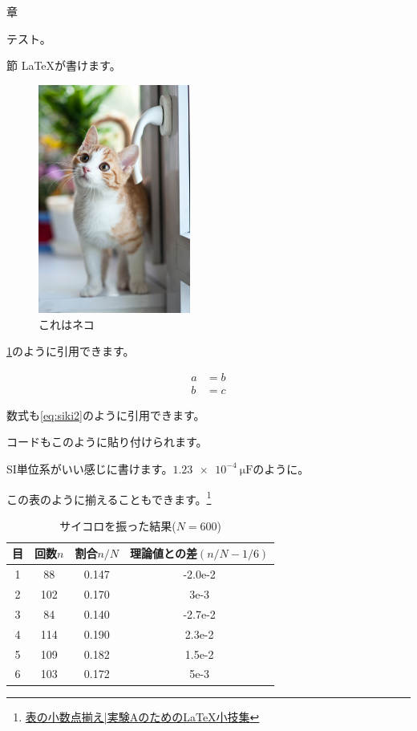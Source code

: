 \documentclass[uplatex, dvipdfmx]{jsarticle}
\begin{document}
\begin{section}{章}

 テスト。

 \begin{subsection}{節}
     \LaTeX が書けます。
 \end{subsection}

 \begin{figure}[H]
     \centering
     \includegraphics[width=5cm]{sample/sample.jpg}
     \caption{これはネコ}
     \label{fig:cat}
 \end{figure}

 \cref{fig:cat}のように引用できます。

 \begin{align}
     a & = b \label{eq:siki1} \\
     b & = c \label{eq:siki2}
 \end{align}

 数式も\cref{eq:siki2}のように引用できます。

 コードもこのように貼り付けられます。


 SI単位系がいい感じに書けます。$\SI{1.23e-4}{\micro \farad}$のように。

 この表のように揃えることもできます。\footnote{\href{https://uec.medit.link/latex/tablealign.html}{表の小数点揃え|実験AのためのLaTeX小技集}}

 \begin{table}[H]
     \centering
     \caption{サイコロを振った結果($N=600$)}
     \begin{tabular}{cS[table-format=3.0]cS[table-format=+1.1e+1]} \hline
         目 & {回数$n$} & 割合$n/N$ & {理論値との差$(n/N - 1/6)$} \\  & 88      & 0.147   & -2.0e-2               \\
         2 & 102     & 0.170   & 3e-3                  \\
         3 & 84      & 0.140   & -2.7e-2               \\
         4 & 114     & 0.190   & 2.3e-2                \\
         5 & 109     & 0.182   & 1.5e-2                \\
         6 & 103     & 0.172   & 5e-3                  \\ \hline
     \end{tabular}
 \end{table}


\end{section}
\end{document}
